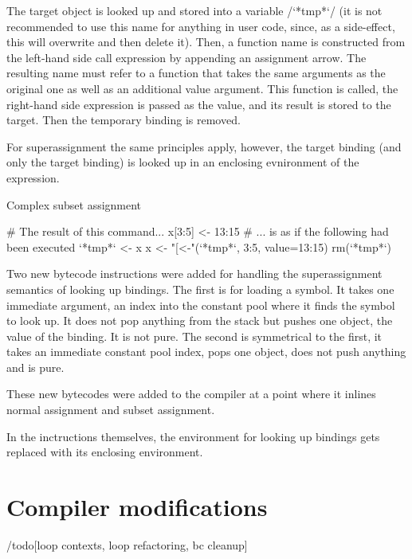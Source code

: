 The target object is looked up and stored into a variable \rinline/`*tmp*`/ (it is not recommended to use this name for anything in user code, since, as a side-effect, this will overwrite and then delete it). Then, a function name is constructed from the left-hand side call expression by appending an assignment arrow. The resulting name must refer to a function that takes the same arguments as the original one as well as an additional value argument. This function is called, the right-hand side expression is passed as the value, and its result is stored to the target. Then the temporary binding is removed.

For superassignment the same principles apply, however, the target binding (and only the target binding) is looked up in an enclosing evnironment of the expression.

\begin{listing}[htbp]
  \caption{\label{lst:subassign}Complex subset assignment}
  \begin{rcode}
# The result of this command...
x[3:5] <- 13:15
# ... is as if the following had been executed
`*tmp*` <- x
x <- "[<-"(`*tmp*`, 3:5, value=13:15)
rm(`*tmp*`)
  \end{rcode}
\end{listing}

Two new bytecode instructions were added for handling the superassignment semantics of looking up bindings. The first is for loading a symbol. It takes one immediate argument, an index into the constant pool where it finds the symbol to look up. It does not pop anything from the stack but pushes one object, the value of the binding. It is not pure\todo. The second is symmetrical to the first, it takes an immediate constant pool index, pops one object, does not push anything and is pure.

These new bytecodes were added to the compiler at a point where it inlines normal assignment and subset assignment.

In the inctructions themselves, the environment for looking up bindings gets replaced with its enclosing environment.


\section{Compiler modifications}

/todo[loop contexts, loop refactoring, bc cleanup]

